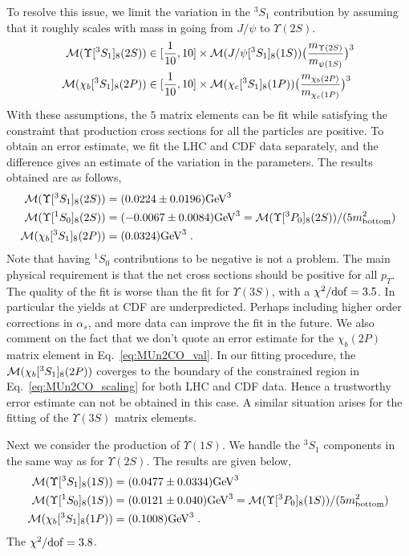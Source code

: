 \documentclass[article,showpacs,preprintnumbers,amsmath,amssymb]{revtex4}
\newcommand{\rGeV}{{\rm GeV}}
\newcommand{\rdof}{{\rm dof}}
\newcommand{\bottom}{{\rm{bottom}}}
\begin{document}
\begin{appendix}
To resolve this issue, we limit the variation in the $^3S_1$ contribution by 
assuming that it roughly scales with mass in going from $J/\psi$ to $\Upsilon(2S)$.
\begin{equation}
\begin{split}
{\cal{M}}(\Upsilon[^3S_1]_{8}(2S)) 
&\in [\frac{1}{10}, 10]\times{\cal{M}}(J/\psi[^3S_1]_{8}(1S))
\bigl(\frac{m_{\Upsilon(2S)}}{m_{\psi(1S)}}\bigr)^3\\
{\cal{M}}(\chi_b[^3S_1]_{8}(2P)) 
&\in [\frac{1}{10}, 10]\times{\cal{M}}(\chi_c[^3S_1]_{8}(1P))
\bigl(\frac{m_{\chi_b(2P)}}{m_{\chi_c(1P)}}\bigr)^3
~\label{eq:MUn2CO_scaling}
\end{split}
\end{equation}
With these assumptions, the $5$ matrix elements can be fit while satisfying the
constraint that production cross sections for all the particles are positive.
To obtain an error estimate, we fit the LHC and CDF data separately, and the
difference gives an estimate of the variation in the parameters. The results obtained are
as follows,
\begin{equation}
\begin{split}
{\cal{M}}(\Upsilon[^3S_1]_{8}(2S)) 
&= (0.0224\pm 0.0196) \rGeV^3\\ 
{\cal{M}}(\Upsilon[^1S_0]_{8}(2S)) &= (-0.0067\pm0.0084) \rGeV^3=
{\cal{M}}(\Upsilon[^3P_0]_{8}(2S))/(5m_{\bottom}^2)\\
{\cal{M}}(\chi_b[^3S_1]_{8}(2P)) &= (0.0324) \rGeV^3\;.
~\label{eq:MUn2CO_val}
\end{split}
\end{equation}
Note that having $^1S_0$ contributions to be negative is not a problem. The
main physical requirement is that the net cross sections should be positive for
all $p_T$.  The quality of the fit is worse than the fit for
$\Upsilon(3S)$, with a $\chi^2/\rdof=3.5$. In particular the yields at CDF are
underpredicted. Perhaps including higher order corrections in $\alpha_s$, and
more data can improve the fit in the future. We also comment on the fact that 
we don't quote an error estimate for the $\chi_b(2P)$ matrix element in
Eq.~\ref{eq:MUn2CO_val}. In our fitting procedure, the ${\cal{M}}(\chi_b[^3S_1]_{8}(2P))$
coverges to the boundary of the constrained region in 
Eq.~\ref{eq:MUn2CO_scaling} for both LHC and CDF data. Hence a trustworthy
error estimate can not be obtained in this case. A similar situation arises for
the fitting of the $\Upsilon(3S)$ matrix elements.

Next we consider the production of $\Upsilon(1S)$. We handle the $^3S_1$
components in the same way as for $\Upsilon(2S)$. The results are given below,
\begin{equation}
\begin{split}
{\cal{M}}(\Upsilon[^3S_1]_{8}(1S)) 
&= (0.0477\pm0.0334) \rGeV^3\\ 
{\cal{M}}(\Upsilon[^1S_0]_{8}(1S)) &= (0.0121\pm0.040) \rGeV^3=
{\cal{M}}(\Upsilon[^3P_0]_{8}(1S))/(5m_{\bottom}^2)\\
{\cal{M}}(\chi_b[^3S_1]_{8}(1P)) &= (0.1008) \rGeV^3\;.
~\label{eq:MUn1CO_val}
\end{split}
\end{equation}
The $\chi^2/\rdof=3.8$.


\end{appendix}
\end{document}
